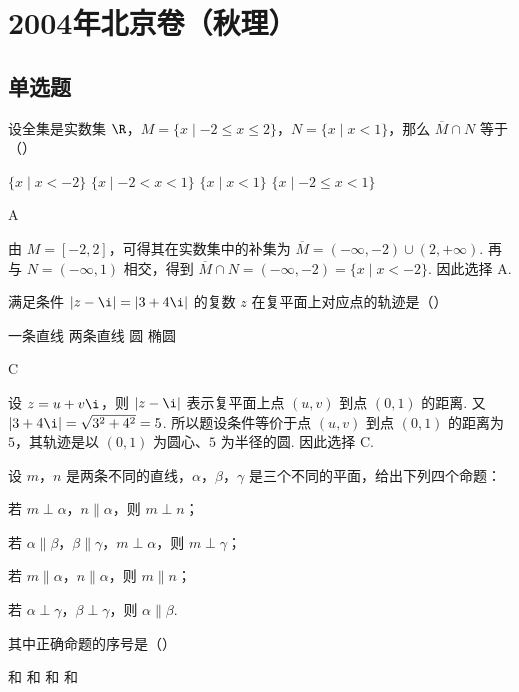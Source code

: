 \chapter{2004年北京卷（秋理）}
\section{单选题}
\begin{problem}
设全集是实数集 \(\R\)，\(M=\{x\mid -2\leqslant x\leqslant 2\}\)，\(N=\{x\mid x<1\}\)，那么 \(\overline{M}\cap N\) 等于（\quad）

\choices
    {\(\{x\mid x<-2\}\)}
    {\(\{x\mid -2<x<1\}\)}
    {\(\{x\mid x<1\}\)}
    {\(\{x\mid -2\leqslant x<1\}\)}
\end{problem}

\begin{answer}
A
\end{answer}

\begin{solution}
由 \(M=[-2,2]\)，可得其在实数集中的补集为
\(\overline{M}=(-\infty,-2)\cup(2,+\infty)\). 再与 \(N=(-\infty,1)\) 相交，得到
\(\overline{M}\cap N=(-\infty,-2)=\{x\mid x<-2\}\).
因此选择 A.
\end{solution}

\begin{problem}
满足条件 \(\left|z-\i\right|=\left|3+4\i\right|\) 的复数 \(z\) 在复平面上对应点的轨迹是（\quad）

\choices
    {一条直线}
    {两条直线}
    {圆}
    {椭圆}
\end{problem}

\begin{answer}
C
\end{answer}

\begin{solution}
设 \(z=u+v\i\)，则 \(\left|z-\i\right|\) 表示复平面上点 \((u,v)\) 到点 \((0,1)\) 的距离. 又
\(\left|3+4\i\right|=\sqrt{3^2+4^2}=5\).
所以题设条件等价于点 \((u,v)\) 到点 \((0,1)\) 的距离为 \(5\)，其轨迹是以 \((0,1)\) 为圆心、\(5\) 为半径的圆. 因此选择 C.
\end{solution}

\begin{problem}
设 \(m\)，\(n\) 是两条不同的直线，\(\alpha\)，\(\beta\)，\(\gamma\) 是三个不同的平面，给出下列四个命题：

\begin{circlelist}
\item 若 \(m\perp\alpha\)，\(n\parallel\alpha\)，则 \(m\perp n\)；
\item 若 \(\alpha\parallel\beta\)，\(\beta\parallel\gamma\)，\(m\perp\alpha\)，则 \(m\perp\gamma\)；
\item 若 \(m\parallel\alpha\)，\(n\parallel\alpha\)，则 \(m\parallel n\)；
\item 若 \(\alpha\perp\gamma\)，\(\beta\perp\gamma\)，则 \(\alpha\parallel\beta\).
\end{circlelist}

其中正确命题的序号是（\quad）

\choices
    {和}
    {和}
    {和}
    {和}
\end{problem}

